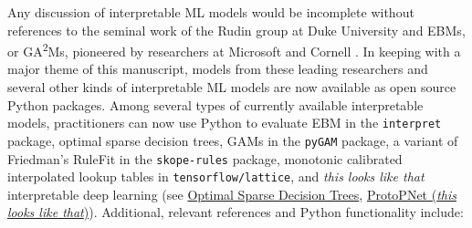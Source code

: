 \documentclass[information,article,accept,moreauthors,pdftex]{Definitions/mdpi}
\begin{document}
Any discussion of interpretable ML models would be incomplete without references to the seminal work of the Rudin group at Duke University  and EBMs, or GA\textsuperscript{2}Ms, pioneered by researchers at Microsoft and Cornell \cite{ga2m,osdt,this_looks_like_that}. In keeping with a major theme of this manuscript, models from these leading researchers and several other kinds of interpretable ML models are now available as open source Python packages. Among several types of currently available interpretable models, practitioners can now use Python to evaluate EBM in the  %
{\texttt{{interpret}}} package, optimal sparse decision trees, GAMs in the 
{\texttt{{pyGAM}}} package, a variant of Friedman's RuleFit  in the 
{\texttt{{skope-rules}}} package, monotonic calibrated interpolated lookup tables in 
{\texttt{{tensorflow/lattice}}}, and \textit{this looks like that} interpretable deep learning \cite{osdt,rulefit,lattice,this_looks_like_that} (see 
\href{https://github.com/xiyanghu/OSDT}{Optimal Sparse Decision Trees},
\href{https://github.com/cfchen-duke/ProtoPNet}{ProtoPNet (\textit{this looks like that})}). Additional, relevant references and Python functionality include:
\end{document}
